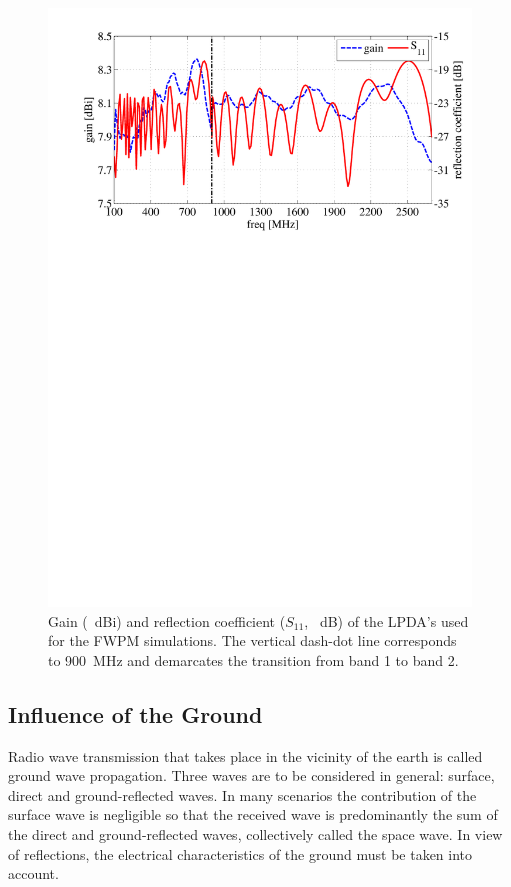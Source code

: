 \documentclass[10pt,journal,twoside]{IEEEtran}
\begin{document}
\begin{figure}%
	\centering
	\includegraphics[width=\linewidth]{antenna_gain_s11_full}%
	\caption{Gain (\SI{}{dBi}) and reflection coefficient ($S_{11}$, \SI{}{dB}) of the LPDA's used for the FWPM simulations. The vertical dash-dot line corresponds to \SI{900}{MHz} and demarcates the transition from band \num{1} to band \num{2}.}%
	\label{fig:gain_s11}%
\end{figure}%
%
\subsection{Influence of the Ground}
Radio wave transmission that takes place in the vicinity of the earth is called ground wave propagation. Three waves are to be considered in general: surface, direct and ground-reflected waves. In many scenarios the contribution of the surface wave is negligible so that the received wave is predominantly the sum of the direct and ground-reflected waves, collectively called the space wave. In view of reflections, the electrical characteristics of the ground must be taken into account.%
%
\end{document}

